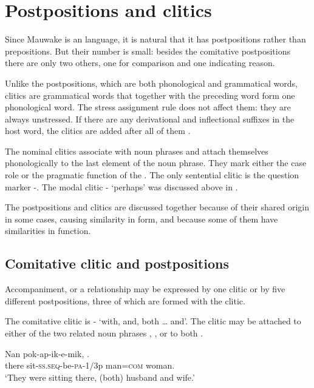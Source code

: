 \section{Postpositions and clitics}\label{sec:3:12}
{}
Since Mauwake is an  language, it is natural that it has postpositions rather than prepositions. But their number is small: besides the comitative postpositions there are only two others, one for comparison and one indicating reason.

Unlike the postpositions, which are both phonological and grammatical words, clitics are grammatical words that together with the preceding word form one phonological word. The stress assignment rule does not affect them: they are always unstressed. If there are any derivational and inflectional suffixes in the host word, the clitics are added after all of them \citep[221--222]{Dixon2010a}.

The nominal clitics associate with noun phrases and attach themselves phonologically to the last element of the noun phrase. They mark either the case role or the pragmatic function of the . The only sentential clitic is the question marker \nobreakdash-. The modal clitic - `perhaps' was discussed above in .

The postpositions and clitics are discussed together because of their shared origin in some cases, causing similarity in form, and because some of them have similarities in function.

\subsection{Comitative clitic and postpositions}\label{sec:3.12.1}
{}
Accompaniment, or a relationship may be expressed by one clitic or by five different postpositions, three of which are formed with the clitic. 

The comitative clitic is - `with, and, both {\dots} and'. The clitic may be attached to either of the two related noun phrases , , or to both .

\ea%
\label{ex:3:x775}
\gll Nan pok-ap-ik-e-mik,  . \\
there sit-\textsc{ss}.\textsc{seq}-be-\textsc{pa}-1/3p man=\textsc{com} woman.\\
\glt`They were sitting there, (both) husband and wife.'
\z


